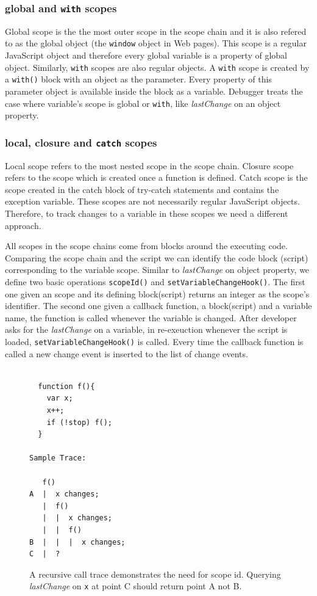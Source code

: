 \documentclass[preprint]{sigplanconf}
\begin{document}
\subsubsection{global and \texttt{with} scopes}
Global scope is the the most outer scope in the scope chain and it is
also refered to as the global object (the \texttt{window}
object in Web pages). This scope is a regular JavaScript object and therefore every
global variable is a property of global object. Similarly,
 \texttt{with} scopes are also regular objects. A \texttt{with}
scope is created by a \texttt{with()} block with an object as the
parameter. Every property of this parameter object is available inside the
block as a variable. Debugger treats the case where variable's scope
is global or \texttt{with}, like \textit{lastChange} on an object
property.

\subsubsection{local, closure and \texttt{catch} scopes}
Local scope refers to the most nested scope in the scope
chain. Closure scope refers to the scope which is created once a
function is defined. Catch scope is the scope created in the catch
block of try-catch statements and contains the exception
variable. These scopes are not necessarily regular JavaScript
objects. Therefore, to track changes to a variable in these scopes we
need a different approach.

All scopes in the scope chains come from blocks around the executing code.
Comparing the scope chain and the script we can identify the code block     %
(script) corresponding to the variable scope. Similar to \textit{lastChange} 
on object property, we define two basic operations \texttt{scopeId()} and
\texttt{setVariableChangeHook()}. The first one given an scope and its defining 
block(script) returns an integer as the scope's identifier. The second one 
given a callback function, a block(script) and a variable name, the function is called
whenever the variable is changed. After developer asks for the \textit{lastChange}
on a variable, in re-exeuction whenever the script is loaded, \texttt{setVariableChangeHook()}
is called. Every time the callback function is called a new change 
event is inserted to the list of change events.


\begin{figure}[htp]
\begin{verbatim}

  function f(){
    var x;
    x++;
    if (!stop) f();
  }

Sample Trace:

   f()
A  |  x changes; 
   |  f()
   |  |  x changes;
   |  |  f()
B  |  |  |  x changes; 
C  |  ?

\end{verbatim}
\caption{A recursive call trace demonstrates the need for scope
  id. Querying \textit{lastChange} on \texttt{x} at point C should
  return point A not B.}
\label{fig:recursive}
\end{figure}
\end{document}
